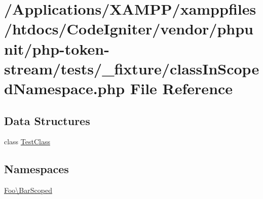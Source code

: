 \hypertarget{class_in_scoped_namespace_8php}{}\section{/\+Applications/\+X\+A\+M\+P\+P/xamppfiles/htdocs/\+Code\+Igniter/vendor/phpunit/php-\/token-\/stream/tests/\+\_\+fixture/class\+In\+Scoped\+Namespace.php File Reference}
\label{class_in_scoped_namespace_8php}
\subsection*{Data Structures}
\begin{DoxyCompactItemize}
\item 
class \mbox{\hyperlink{class_foo_1_1_bar_scoped_1_1_test_class}{Test\+Class}}
\end{DoxyCompactItemize}
\subsection*{Namespaces}
\begin{DoxyCompactItemize}
\item 
 \mbox{\hyperlink{namespace_foo_1_1_bar_scoped}{Foo\textbackslash{}\+Bar\+Scoped}}
\end{DoxyCompactItemize}
